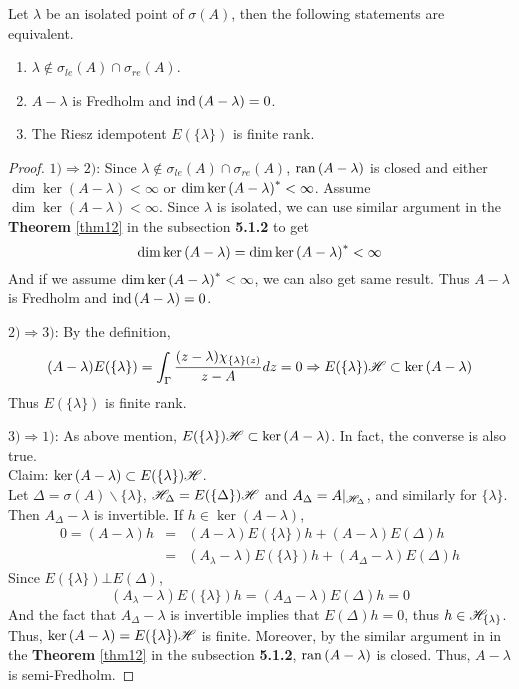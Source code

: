 \begin{prop}
	Let $\lambda$ be an isolated point of $\sigma(A)$, then the following statements are equivalent.
	\begin{enumerate}[label = \arabic*)]
		\item $\lambda \notin \sigma_{le}(A) \cap \sigma_{re}(A)$.
		\item $A-\lambda$ is Fredholm and $\operatorname{ind}{(A-\lambda)} = 0$.
		\item The Riesz idempotent $E(\{\lambda\})$ is finite rank.
	\end{enumerate}
\end{prop}
\begin{proof}
	$1) \Rightarrow 2)$: Since $\lambda \notin \sigma_{le}(A) \cap \sigma_{re}(A)$, $\operatorname{ran}{(A-\lambda)}$ is closed and either $\dim{\ker{(A-\lambda)}} < \infty$ or $\dim{\ker{(A-\lambda)}^{*}} < \infty$. Assume $\dim{\ker{(A-\lambda)}} < \infty$. Since $\lambda$ is isolated, we can use similar argument in the \textbf{Theorem} \ref{thm12} in the subsection \textbf{5.1.2} to get
	\begin{equation*}
		\dim{\ker{(A-\lambda)}} = \dim{\ker{(A-\lambda)}^{*}} < \infty
	\end{equation*}
	And if we assume $\dim{\ker{(A-\lambda)}^{*}} < \infty$, we can also get same result. Thus $A-\lambda$ is Fredholm and $\operatorname{ind}{(A-\lambda)} = 0$.
	\item $2) \Rightarrow 3)$: By the definition,
	\begin{equation*}
		(A-\lambda)E(\{\lambda\}) = \int_{\Gamma} \frac{(z-\lambda)\chi_{\{\lambda\}(z)}}{z - A} dz = 0 \Rightarrow E(\{\lambda\})\mathscr{H} \subset \ker{(A-\lambda)}
	\end{equation*}
	Thus $E(\{\lambda\})$ is finite rank.
	\item $3) \Rightarrow 1)$: As above mention, $E(\{\lambda\})\mathscr{H} \subset \ker{(A-\lambda)}$. In fact, the converse is also true.\\
	Claim: $\ker{(A-\lambda)} \subset E(\{\lambda\})\mathscr{H}$. \\
	Let $\Delta = \sigma(A) \backslash \{\lambda\}$, $\mathscr{H}_{\Delta} = E(\{\Delta\})\mathscr{H}$ and $A_{\Delta} = A|_{\mathscr{H}_{\Delta}}$, and similarly for $\{\lambda\}$. Then $A_{\Delta} - \lambda$ is invertible. If $h \in \ker{(A-\lambda)}$, 
	\begin{eqnarray*}
	0 = (A-\lambda)h &=& (A-\lambda)E(\{\lambda\})h+(A-\lambda)E(\Delta)h \\
	&=& (A_{\lambda}-\lambda)E(\{\lambda\})h + (A_{\Delta}-\lambda)E(\Delta)h
	\end{eqnarray*}
	Since $E(\{\lambda\}) \bot E(\Delta)$, 
	\begin{equation*}
		(A_{\lambda}-\lambda)E(\{\lambda\})h = (A_{\Delta}-\lambda)E(\Delta)h = 0
	\end{equation*}
	And the fact that $A_{\Delta} - \lambda$ is invertible implies that $E(\Delta)h = 0$, thus $h \in \mathscr{H}_{\{\lambda\}}$. \\
	Thus, $\ker{(A-\lambda)} = E(\{\lambda\})\mathscr{H}$ is finite. Moreover, by the similar argument in in the \textbf{Theorem} \ref{thm12} in the subsection \textbf{5.1.2}, $\operatorname{ran}{(A-\lambda)}$ is closed. Thus, $A-\lambda$ is semi-Fredholm.
\end{proof}

